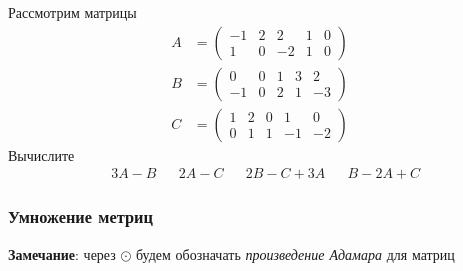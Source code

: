 \begin{exercise}
Рассмотрим матрицы
\begin{align*}
	A&=\begin{pmatrix}
		-1 & 2 & 2 & 1 & 0 \\ 1 & 0 & -2 & 1 & 0
	\end{pmatrix} \\
	B&=\begin{pmatrix}
		0 & 0 & 1 & 3 & 2 \\ -1 & 0 & 2 & 1 & -3
	\end{pmatrix} \\
	C&=\begin{pmatrix}
		1 & 2 & 0 & 1 & 0 \\ 0 & 1 & 1 & -1 & -2
	\end{pmatrix}
\end{align*}
Вычислите
\begin{align*}
	& 3A-B & &2A-C & &2B-C+3A & &B-2A+C
\end{align*}
\end{exercise}

\subsubsection{Умножение метриц}

\textbf{Замечание}: через \(\odot\) будем обозначать \textit{произведение Адамара} для матриц

